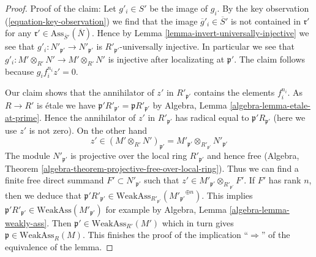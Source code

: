 \begin{proof}
\medskip\noindent
Proof of the claim: Let $g'_i \in S'$ be the image of $g_i$.
By the key observation (\ref{equation-key-observation})
we find that the image $\overline{g}'_i \in \overline{S}'$
is not contained in $\mathfrak r'$ for any
$\mathfrak r' \in \text{Ass}_{\overline{S}'}(\overline{N})$.
Hence by Lemma \ref{lemma-invert-universally-injective}
we see that $g'_i : N'_{\mathfrak p'} \to N'_{\mathfrak p'}$ is
$R'_{\mathfrak p'}$-universally injective. In particular
we see that $g'_i : M' \otimes_{R'} N' \to M' \otimes_{R'} N'$ is
injective after localizating at $\mathfrak p'$. The claim
follows because $g_i f_i^{n_i} z' = 0$.

\medskip\noindent
Our claim shows that the annihilator of $z'$ in $R'_{\mathfrak p'}$
contains the elements $f_i^{n_i}$. As $R \to R'$ is \'etale we have
$\mathfrak p'R'_{\mathfrak p'} = \mathfrak pR'_{\mathfrak p'}$
by Algebra, Lemma \ref{algebra-lemma-etale-at-prime}.
Hence the annihilator of $z'$ in $R'_{\mathfrak p'}$ has radical equal to
$\mathfrak p' R_{\mathfrak p'}$ (here we use $z'$ is not zero).
On the other hand
$$
z' \in (M' \otimes_{R'} N')_{\mathfrak p'} =
M'_{\mathfrak p'} \otimes_{R'_{\mathfrak p'}} N'_{\mathfrak p'}
$$
The module $N'_{\mathfrak p'}$ is projective over the local ring
$R'_{\mathfrak p'}$ and hence free
(Algebra, Theorem \ref{algebra-theorem-projective-free-over-local-ring}).
Thus we can find a finite free direct summand $F' \subset N'_{\mathfrak p'}$
such that $z' \in M'_{\mathfrak p'} \otimes_{R'_{\mathfrak p'}} F'$.
If $F'$ has rank $n$, then we deduce that
$\mathfrak p' R'_{\mathfrak p'} \in
\text{WeakAss}_{R'_{\mathfrak p'}}({M'_{\mathfrak p'}}^{\oplus n})$.
This implies
$\mathfrak p'R'_{\mathfrak p'} \in \text{WeakAss}(M'_{\mathfrak p'})$
for example by Algebra, Lemma \ref{algebra-lemma-weakly-ass}.
Then $\mathfrak p' \in \text{WeakAss}_{R'}(M')$
which in turn gives $\mathfrak p \in \text{WeakAss}_R(M)$.
This finishes the proof of the implication
``$\Rightarrow$'' of the equivalence of the lemma.


\end{proof}
